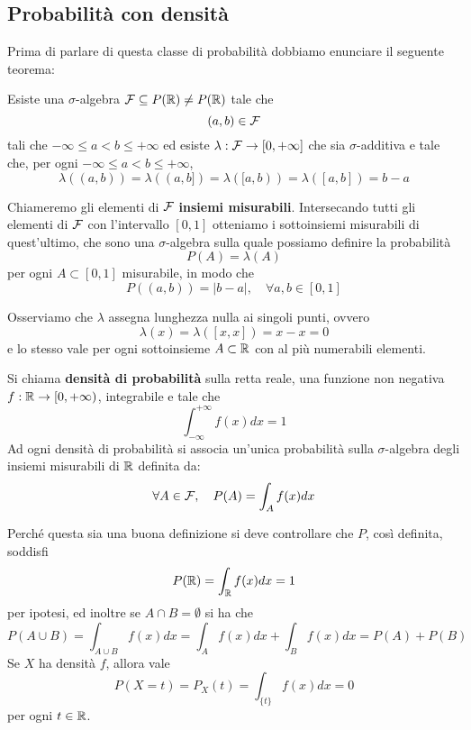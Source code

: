 \subsection{Probabilità con densità}
Prima di parlare di questa classe di probabilità dobbiamo enunciare il seguente teorema:
\begin{theorem}
	Esiste una $\sigma$-algebra $\mathcal{F} \subseteq P(\mathbb{R}) \neq P(\mathbb{R})$ tale che
	\[ (a, b) \in \mathcal{F} \]
	tali che $-\infty \leq a < b \leq +\infty$ ed esiste $\lambda : \mathcal{F} \to [0, +\infty]$ che sia
	$\sigma$-additiva e tale che, per ogni $-\infty \leq a < b \leq +\infty$,
	\[ \lambda((a,b)) = \lambda((a,b]) = \lambda ([a,b)) = \lambda([a,b]) = b - a \]
\end{theorem}

Chiameremo gli elementi di $\mathcal{F}$ \textbf{insiemi misurabili}. Intersecando tutti gli elementi di
$\mathcal{F}$ con l'intervallo $[0,1]$ otteniamo i sottoinsiemi misurabili di quest'ultimo, che sono una
$\sigma$-algebra sulla quale possiamo definire la probabilità
\[ P (A) = \lambda (A) \]
per ogni $A \subset [0,1]$ misurabile, in modo che
\[ P((a, b)) = |b-a|, \quad \forall a,b \in [0,1] \]

\begin{observation}
	Osserviamo che $\lambda$ assegna lunghezza nulla ai singoli punti, ovvero
	\[ \lambda(x) = \lambda([x,x]) = x - x = 0 \]
	e lo stesso vale per ogni sottoinsieme $A \subset \mathbb{R}$ con al più numerabili elementi.
\end{observation}

\begin{definition}
	Si chiama \textbf{densità di probabilità} sulla retta reale, una funzione non negativa
	$f : \mathbb{R} \to [0, +\infty)$, integrabile e tale che
	\[ \int_{-\infty}^{+\infty} f(x) dx = 1 \]
	Ad ogni densità di probabilità si associa un'unica probabilità sulla $\sigma$-algebra degli
	insiemi misurabili di $\mathbb{R}$ definita da:
	\[ \forall A \in \mathcal{F}, \quad P(A) = \int_A f(x) dx \]
\end{definition}

Perché questa sia una buona definizione si deve controllare che $P$, così definita, soddisfi
\[ P(\mathbb{R}) = \int_{\mathbb{R}} f(x) dx = 1 \]
per ipotesi, ed inoltre se $A \cap B = \emptyset$ si ha che
\[ P(A \cup B) = \int_{A \cup B} f(x) dx = \int_A f(x) dx + \int_B f(x) dx = P(A) + P(B) \]
Se $X$ ha densità $f$, allora vale
\[ P(X = t) = P_X (t) = \int_{\{t\}} f(x) dx = 0 \]
per ogni $t \in \mathbb{R}$.
